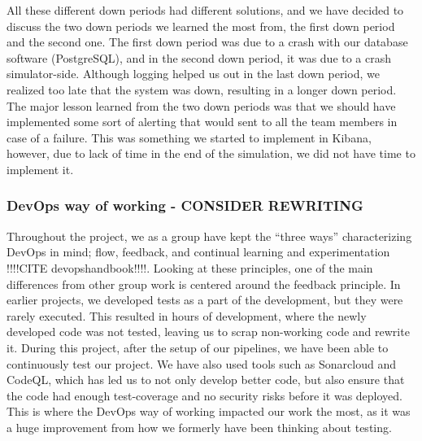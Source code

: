 All these different down periods had different solutions, and we have decided to discuss the two down periods we learned the most from, the first down period and the second one. The first down period was due to a crash with our database software (PostgreSQL), and in the second down period, it was due to a crash simulator-side. Although logging helped us out in the last down period, we realized too late that the system was down, resulting in a longer down period. The major lesson learned from the two down periods was that we should have implemented some sort of alerting that would sent to all the team members in case of a failure. This was something we started to implement in Kibana, however, due to lack of time in the end of the simulation, we did not have time to implement it.

\subsubsection{DevOps way of working - CONSIDER REWRITING}

Throughout the project, we as a group have kept the “three ways” characterizing DevOps in mind; flow, feedback, and continual learning and experimentation !!!!CITE devopshandbook!!!!. Looking at these principles, one of the main differences from other group work is centered around the feedback principle. In earlier projects, we developed tests as a part of the development, but they were rarely executed. This resulted in hours of development, where the newly developed code was not tested, leaving us to scrap non-working code and rewrite it. During this project, after the setup of our pipelines, we have been able to continuously test our project. We have also used tools such as Sonarcloud and CodeQL, which has led us to not only develop better code, but also ensure that the code had enough test-coverage and no security risks before it was deployed. This is where the DevOps way of working impacted our work the most, as it was a huge improvement from how we formerly have been thinking about testing.
